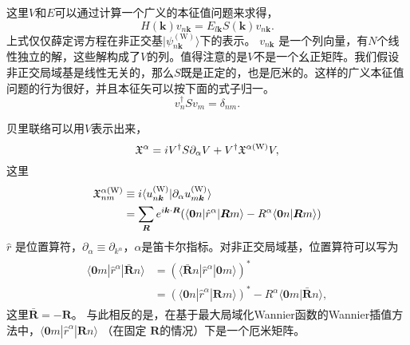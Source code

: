 这里$V$和$E$可以通过计算一个广义的本征值问题来求得，
\begin{equation}
H(\boldsymbol{k})v_{n\boldsymbol{k}}=E_{l\boldsymbol{k}}S(\boldsymbol{k})v_{n\boldsymbol{k}}.\label{eq:gep}
\end{equation}
上式仅仅薛定谔方程在非正交基$|\psi_{n\boldsymbol{k}}^{(\text{W})}\rangle$下的表示。 $v_{n\boldsymbol{k}}$ 是一个列向量，有$N$个线性独立的解，这些解构成了$V$的列。值得注意的是$V$不是一个幺正矩阵。我们假设非正交局域基是线性无关的，那么$S$既是正定的，也是厄米的。这样的广义本征值问题的行为很好，并且本征矢可以按下面的式子归一。
\begin{equation}
v_{n}^{\dagger}Sv_{m}=\delta_{nm}.\label{eq:norm}
\end{equation}

贝里联络可以用$V$表示出来，
\begin{equation}
\mathfrak{X}^{\alpha}=iV^{\dagger}S\partial_{\alpha}V+V{}^{\dagger}\mathfrak{X}^{\alpha(\text{W})}V,\label{eq:A}
\end{equation}
这里
\begin{align}
\begin{split}
\mathfrak{X}_{nm}^{\alpha(\text{W})} & \equiv i\langle u_{n\boldsymbol{k}}^{(\text{W})}|\partial_{\alpha}u_{m\boldsymbol{k}}^{(\text{W})}\rangle\\
& =\sum_{\boldsymbol{R}}e^{i\boldsymbol{k}\cdot\boldsymbol{R}}(\langle\boldsymbol{0}n|\hat{r}^{\alpha}|\boldsymbol{R}m\rangle-R^{\alpha}\langle\boldsymbol{0}n|\boldsymbol{R}m\rangle)
\end{split}
\end{align}
$\hat{r}$ 是位置算符，$\partial_{\alpha}\equiv\partial_{k^{\alpha}}$，$\alpha$是笛卡尔指标。对非正交局域基，位置算符可以写为
\begin{align}
\begin{split}
\langle\boldsymbol{0}m|\hat{r}^{\alpha}|\bar{\boldsymbol{R}}n\rangle & =(\langle\bar{\boldsymbol{R}}n|\hat{r}^{\alpha}|\boldsymbol{0}m\rangle)^{*}\\
& =(\langle\boldsymbol{0}n|\hat{r}^{\alpha}|\boldsymbol{R}m\rangle)^{*}-R^{\alpha}\langle\boldsymbol{0}m|\bar{\boldsymbol{R}}n\rangle,
\end{split}
\end{align}
这里$\bar{\boldsymbol{R}}=-\boldsymbol{R}$。
与此相反的是，在基于最大局域化Wannier函数的Wannier插值方法中，$\langle\boldsymbol{0}m|\hat{r}^{\alpha}|\boldsymbol{R}n\rangle$ （在固定 $\boldsymbol{R}$的情况）下是一个厄米矩阵。 

